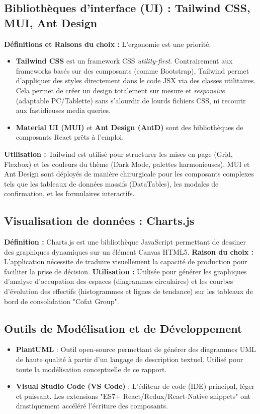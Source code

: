 \subsection{Bibliothèques d'interface (UI) : Tailwind CSS, MUI, Ant Design}
\textbf{Définitions et Raisons du choix :} L'ergonomie est une priorité. 
\begin{itemize}
    \item \textbf{Tailwind CSS} est un framework CSS \textit{utility-first}. Contrairement aux frameworks basés sur des composants (comme Bootstrap), Tailwind permet d'appliquer des styles directement dans le code JSX via des classes utilitaires. Cela permet de créer un design totalement sur mesure et \textit{responsive} (adaptable PC/Tablette) sans s'alourdir de lourds fichiers CSS, ni recourir aux fastidieuses media queries.
    \item \textbf{Material UI (MUI)} et \textbf{Ant Design (AntD)} sont des bibliothèques de composants React prêts à l'emploi. 
\end{itemize}
\textbf{Utilisation :} Tailwind est utilisé pour structurer les mises en page (Grid, Flexbox) et les couleurs du thème (Dark Mode, palettes harmonieuses). MUI et Ant Design sont déployés de manière chirurgicale pour les composants complexes tels que les tableaux de données massifs (DataTables), les modales de confirmation, et les formulaires interactifs.

\subsection{Visualisation de données : Charts.js}
\textbf{Définition :} Charts.js est une bibliothèque JavaScript permettant de dessiner des graphiques dynamiques sur un élément Canvas HTML5.
\newline
\textbf{Raison du choix :} L'application nécessite de traduire visuellement la capacité de production pour faciliter la prise de décision.
\newline
\textbf{Utilisation :} Utilisée pour générer les graphiques d'analyse d'occupation des espaces (diagrammes circulaires) et les courbes d'évolution des effectifs (histogrammes et lignes de tendance) sur les tableaux de bord de consolidation "Cofat Group".

\subsection{Outils de Modélisation et de Développement}
\begin{itemize}
    \item \textbf{PlantUML} : Outil open-source permettant de générer des diagrammes UML de haute qualité à partir d'un langage de description textuel. Utilisé pour toute la modélisation conceptuelle de ce rapport.
    \item \textbf{Visual Studio Code (VS Code)} : L'éditeur de code (IDE) principal, léger et puissant. Les extensions "ES7+ React/Redux/React-Native snippets" ont drastiquement accéléré l'écriture des composants.
\end{itemize}


